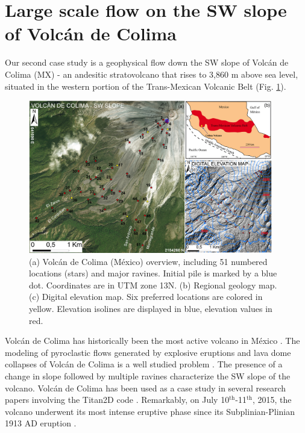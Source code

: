 \documentclass{article}
\begin{document}
\section{Large scale flow on the SW slope of Volc{\'a}n de Colima}\label{QoI2}
Our second case study is a geophysical flow down the SW slope of Volc{\'a}n de Colima (MX) - an andesitic stratovolcano that rises to 3,860 m above sea level, situated in the western portion of the Trans-Mexican Volcanic Belt (Fig. \ref{fig:Colima-first}).
\begin{figure}[H]
    \includegraphics[width=0.95\textwidth]{figures/Colima/ColimaFig.jpg}
    \centering
    \caption{(a) Volc{\'a}n de Colima (M{\'e}xico) overview, including 51 numbered locations (stars) and major ravines. Initial pile is marked by a blue dot. Coordinates are in UTM zone 13N. (b) Regional geology map. (c) Digital elevation map. Six preferred locations are colored in yellow. Elevation isolines are displayed in blue, elevation values in red.}
    \label{fig:Colima-first}
\end{figure}
Volc{\'a}n de Colima has historically been the most active volcano in M{\'e}xico \citep{DeLaCruzReina1993, Zobin2002, Gonzalez2002}. The modeling of pyroclastic flows generated by explosive eruptions and lava dome collapses of Volc{\'a}n de Colima is a well studied problem \citep{DelPozzo1995,Sheridan1995,Saucedo2002,Saucedo2004,Saucedo2005,Sarocchi2011,Capra2015}. The presence of a change in slope followed by multiple ravines characterize the SW slope of the volcano. Volc{\'a}n de Colima has been used as a case study in several research papers involving the Titan2D code \citep{Rupp2004, Rupp2006, Dalbey2008, Yu2009, Sulpizio2010, Capra2011, Aghakhani2016}. Remarkably, on July 10$^{\mathrm{th}}$-11$^{\mathrm{th}}$, 2015, the volcano underwent its most intense eruptive phase since its Subplinian-Plinian 1913 AD eruption \citep{Saucedo2010, Zobin2015, ReyesDaVilla2016, Capra2016, Macorps2018}.
\end{document}
